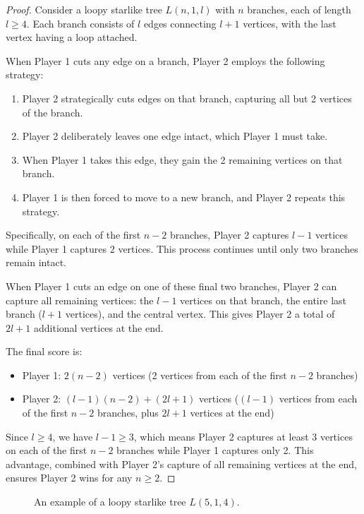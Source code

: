 \documentclass{article}
\begin{document}
\begin{proof}
Consider a loopy starlike tree $L(n, 1, l)$ with $n$ branches, each of length $l \geq 4$. Each branch consists of $l$ edges connecting $l+1$ vertices, with the last vertex having a loop attached.

When Player 1 cuts any edge on a branch, Player 2 employs the following strategy:
\begin{enumerate}
    \item Player 2 strategically cuts edges on that branch, capturing all but 2 vertices of the branch.
    \item Player 2 deliberately leaves one edge intact, which Player 1 must take.
    \item When Player 1 takes this edge, they gain the 2 remaining vertices on that branch.
    \item Player 1 is then forced to move to a new branch, and Player 2 repeats this strategy.
\end{enumerate}

Specifically, on each of the first $n-2$ branches, Player 2 captures $l-1$ vertices while Player 1 captures 2 vertices. This process continues until only two branches remain intact.

When Player 1 cuts an edge on one of these final two branches, Player 2 can capture all remaining vertices: the $l-1$ vertices on that branch, the entire last branch ($l+1$ vertices), and the central vertex. This gives Player 2 a total of $2l+1$ additional vertices at the end.

The final score is:
\begin{itemize}
    \item Player 1: $2(n-2)$ vertices (2 vertices from each of the first $n-2$ branches)
    \item Player 2: $(l-1)(n-2) + (2l+1)$ vertices ($(l-1)$ vertices from each of the first $n-2$ branches, plus $2l+1$ vertices at the end)
\end{itemize}

Since $l \geq 4$, we have $l-1 \geq 3$, which means Player 2 captures at least 3 vertices on each of the first $n-2$ branches while Player 1 captures only 2. This advantage, combined with Player 2's capture of all remaining vertices at the end, ensures Player 2 wins for any $n \geq 2$.
\end{proof}

\begin{figure}[hbt!]
\centering
{}
\caption{An example of a loopy starlike tree $L(5, 1, 4)$.}
\label{fig:hanging-starlike-1}
\end{figure}
\FloatBarrier
\end{document}
